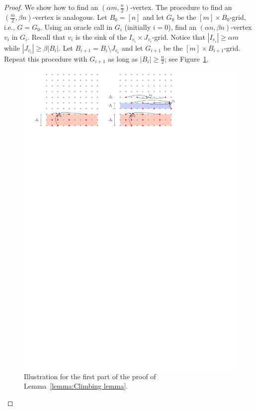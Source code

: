 \documentclass[runningheads,a4paper]{llncs}
\begin{document}
\begin{proof}
We show how to find an $(\alpha m,  \frac{n}{2})$-vertex. The procedure to find an $( \frac{m}{2}, \beta n)$-vertex is analogous.
Let $B_0 = [n]$ and let $G_0$ be the $[m]\times B_0$-grid, i.e., $G = G_0$.
Using an oracle call in $G_i$ (initially $i = 0$), find an $(\alpha n, \beta n)$-vertex $v_i$ in $G_i$. 
Recall that $v_i$ is the sink of the $I_{v_i}\times J_{v_i}$-grid. %
Notice that $|I_{v_i}| \geq \alpha m$ while $|J_{v_i}| \geq \beta |B_i|$.
Let $B_{i+1} = B_i\setminus J_{v_i}$ and let $G_{i+1}$ be the $[m]\times B_{i+1}$-grid. 
Repeat this procedure with $G_{i+1}$ as long as $|B_i| \geq  \frac{n}{2}$; see Figure~\ref{fig:Climbing Lemma}.

\begin{figure}[h]
\centering
\includegraphics[width=1\textwidth]{ClimbingLemma.pdf}
\caption{\small Illustration for the first part of the proof of Lemma~\ref{lemma:Climbing lemma}.}
\label{fig:Climbing Lemma}
\end{figure}


\end{proof}
\end{document}
